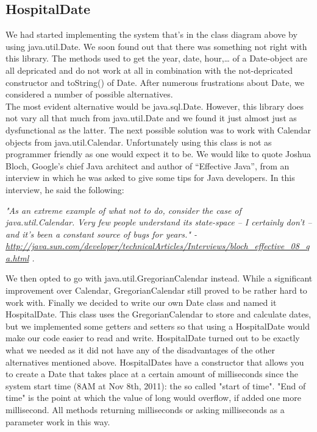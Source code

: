 \documentclass[12pt]{article}
\begin{document}
\subsection{HospitalDate}
We had started implementing the system that’s in the class diagram above by using java.util.Date. We soon found out that there was something not right with this library. The methods used to get the year, date, hour,… of a Date-object are all depricated and do not work at all in combination with the not-depricated constructor and toString() of Date. After numerous frustrations about Date, we considered a number of possible alternatives.
\\The most evident alternative would be java.sql.Date. However, this library does not vary all that much from java.util.Date and we found it just almost just as dysfunctional as the latter. The next possible solution was to work with Calendar objects from java.util.Calendar. Unfortunately using this class is not as programmer friendly as one would expect it to be. We would like to quote Joshua Bloch, Google's chief Java architect and author of “Effective Java”, from an interview in which he was asked to give some tips for Java developers. In this interview, he said the following:
\begin{center}
\emph{"As an extreme example of what not to do, consider the case of java.util.Calendar. Very few people understand its state-space -- I certainly don't -- and it's been a constant source of bugs for years." - \url{http://java.sun.com/developer/technicalArticles/Interviews/bloch_effective_08_qa.html} .}
\end{center}
We then opted to go with java.util.GregorianCalendar instead. While a significant improvement over Calendar, GregorianCalendar still proved to be rather hard to work with. Finally we decided to write our own Date class and named it HospitalDate. This class uses the GregorianCalendar to store and calculate dates, but we implemented some getters and setters so that using a HospitalDate would make our code easier to read and write. HospitalDate turned out to be exactly what we needed as it did not have any of the disadvantages of the other alternatives mentioned above.
\newline HospitalDates have a constructor that allows you to create a Date that takes place at a certain amount of milliseconds since the system start time (8AM at Nov 8th, 2011): the so called "start of time". "End of time" is the point at which the value of long would overflow, if added one more millisecond. All methods returning milliseconds or asking milliseconds as a parameter work in this way. 
\end{document}
